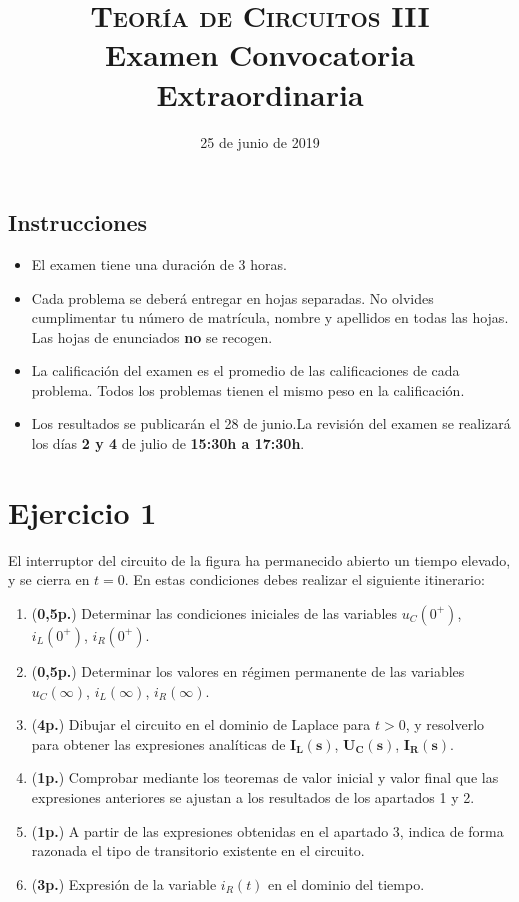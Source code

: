 \documentclass[12pt]{article}
\newcommand{\laplace}[1]{\mathbf{#1}(\mathbf{s})}
\begin{document}
\title{\textsc{Teoría de Circuitos III}\\Examen Convocatoria Extraordinaria}

\date{25 de junio de  2019}

\maketitle

\subsection*{Instrucciones}
\begin{itemize}
\item El examen tiene una duración de 3 horas.
\item Cada problema se deberá entregar en hojas separadas. No olvides cumplimentar tu número de matrícula, nombre y apellidos en todas las hojas. Las hojas de enunciados \textbf{no} se recogen.
\item La calificación del examen es el promedio de las calificaciones
  de cada problema. Todos los problemas tienen el mismo peso en la
  calificación.
\item Los resultados se publicarán el 28 de junio.La revisión del
  examen se realizará los días \textbf{2 y 4} de julio de
  \textbf{15:30h a 17:30h}.
\end{itemize}

\clearpage

\section*{Ejercicio 1}

El interruptor del circuito de la figura ha permanecido abierto un tiempo elevado, y se cierra en $t = 0$. En estas condiciones debes realizar el siguiente itinerario:

\begin{enumerate}
\item (\textbf{0,5p.}) Determinar las condiciones iniciales de las variables $u_C(0^+)$, $i_L(0^+)$, $i_R(0^+)$.
\item (\textbf{0,5p.}) Determinar los valores en régimen permanente de las variables $u_C(\infty)$, $i_L(\infty)$, $i_R(\infty)$.
\item (\textbf{4p.}) Dibujar el circuito en el dominio de Laplace para $t > 0$, y resolverlo para obtener las expresiones analíticas de $\laplace{I_L}$, $\laplace{U_C}$, $\laplace{I_R}$.
\item (\textbf{1p.}) Comprobar mediante los teoremas de valor inicial y valor final que las expresiones anteriores se ajustan a los resultados de los apartados 1 y 2.

\item (\textbf{1p.}) A partir de las expresiones obtenidas en el apartado 3, indica de forma razonada el tipo de transitorio existente en el circuito.

\item (\textbf{3p.}) Expresión de la variable $i_R(t)$ en el dominio del tiempo.
\end{enumerate}
\end{document}

